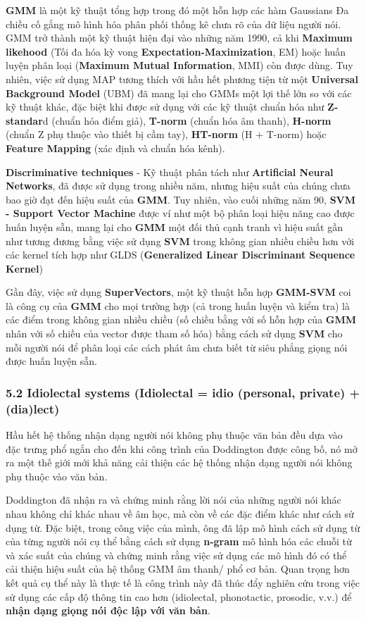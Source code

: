 \documentclass{article}
\begin{document}
	\textbf{GMM} là một kỹ thuật tổng hợp trong đó một hỗn hợp các hàm Gaussians Đa chiều cố gắng mô hình hóa phân phối thống kê chưa rõ của dữ liệu người nói. GMM trở thành một kỹ thuật hiện đại vào những năm 1990, cả khi \textbf{Maximum likehood} (Tối đa hóa kỳ vong \textbf{Expectation-Maximization}, EM) hoặc huấn luyện phân loại (\textbf{Maximum Mutual Information}, MMI) còn được dùng. Tuy nhiên, việc sử dụng MAP tương thích với hầu hết phương tiện từ một \textbf{Universal Background Model} (UBM) đã mang lại cho GMMs một lợi thế lớn so với các kỹ thuật khác, đặc biệt khi được sử dụng với các kỹ thuật chuẩn hóa như \textbf{Z-standar}d (chuẩn hóa điểm giả), \textbf{T-norm} (chuẩn hóa âm thanh), \textbf{H-norm} (chuẩn Z phụ thuộc vào thiết bị cầm tay), \textbf{HT-norm} (H + T-norm) hoặc \textbf{Feature Mapping} (xác định và chuẩn hóa kênh).
	
	\textbf{Discriminative techniques} - Kỹ thuật phân tách như \textbf{Artificial Neural Networks}, đã được sử dụng trong nhiều năm, nhưng hiệu suất của chúng chưa bao giờ đạt đến hiệu suất của \textbf{GMM}. Tuy nhiên, vào cuối những năm 90, \textbf{SVM - Support Vector Machine} được ví như một bộ phân loại hiệu năng cao được huấn luyện sẵn, mang lại cho \textbf{GMM} một đối thủ cạnh tranh vì hiệu suất gần như tương đương bằng việc sử dụng \textbf{SVM} trong không gian nhiều chiều hơn với các kernel tích hợp như GLDS (\textbf{Generalized Linear Discriminant Sequence Kernel})
	
	Gần đây, việc sử dụng \textbf{SuperVectors}, một kỹ thuật hỗn hợp \textbf{GMM-SVM} coi là công cụ của \textbf{GMM} cho mọi trường hợp (cả trong huấn luyện và kiểm tra) là các điểm trong không gian nhiều chiều (số chiều bằng với số hỗn hợp của \textbf{GMM} nhân với số chiều của vector được tham số hóa) bằng cách sử dụng \textbf{SVM} cho mỗi người nói để phân loại các cách phát âm chưa biết từ siêu phẳng giọng nói được huấn luyện sẵn.
	
	\subsubsection{5.2 Idiolectal systems (Idiolectal = idio (personal, private) + (dia)lect)}
	\qquad Hầu hết hệ thống nhận dạng người nói không phụ thuộc văn bản đều dựa vào đặc trưng phổ ngắn cho đến khi công trình của Doddington được công bố, nó mở ra một thế giới mới khả năng cải thiện các hệ thống nhận dạng người nói không phụ thuộc vào văn bản. 
	
	Doddington đã nhận ra và chứng minh rằng lời nói của những người nói khác nhau không chỉ khác nhau về âm học, mà còn về các đặc điểm khác như cách sử dụng từ. Đặc biệt, trong công việc của mình, ông đã lập mô hình cách sử dụng từ của từng người nói cụ thể bằng cách sử dụng \textbf{n-gram} mô hình hóa các chuỗi từ và xác suất của chúng và chứng minh rằng việc sử dụng các mô hình đó có thể cải thiện hiệu suất của hệ thống GMM âm thanh/ phổ cơ bản. Quan trọng hơn kết quả cụ thể này là thực tế là công trình này đã thúc đẩy nghiên cứu trong việc sử dụng các cấp độ thông tin cao hơn (idiolectal, phonotactic, prosodic, v.v.) để \textbf{nhận dạng giọng nói độc lập với văn bản}. 
	
\end{document}

